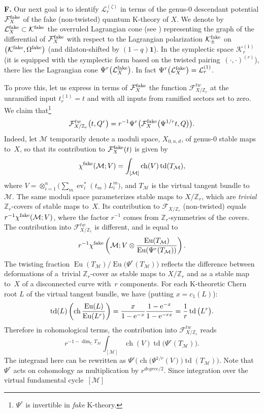 \documentclass[pdftex]{sigma}
\def\F{\mathcal F}
\def\K{\mathcal K}
\def\L{\mathcal L}
\def\1{\mathbf 1}
\def\M{\mathcal M}
\def\ZZ{\mathbb Z}
\def\CC{\mathbb C}
\def\ev{\operatorname{ev}}
\def\td{\operatorname{td}}
\def\ch{\operatorname{ch}}
\def\Eu{\operatorname{Eu}}
\begin{document}
{\bf F.} Our next goal is to identify $\L_r^{(\zeta)}$ in terms of the genus-0 descendant
potential $\F_X^{\rm fake}$ of the fake (non-twisted) quantum K-theory of $X$.
We denote by $\L_X^{\rm fake}\subset \K^{\rm fake}$ the overruled Lag\-rangian cone (see \cite{Co, GiF, GiTo}) representing the graph of the differential of $\F_X^{\rm fake}$ with respect to the Lagrangian polarization $\K^{\rm fake}_{\pm}$ on $\big(\K^{\rm fake}, \Omega^{\rm fake}\big)$ (and dilaton-shifted by $(1-q)\1$). In the symplectic space $\K_r^{(1)}$ (it is equipped with the symplectic form based on the twisted pairing~$(\cdot, \cdot)^{(r)}$), there lies the Lagrangian cone $\Psi^r\big(\L_X^{\rm fake}\big)$. In fact $\Psi^r\big(\L_X^{\rm fake}\big)=\L_r^{(1)}$.

To prove this, let us express in terms of $\F_X^{\rm fake}$ the function $\F_{X/\ZZ_r}^{tw}$ at the unramified input $t^{(1)}_r=t$ and with all inputs from ramified sectors set to zero. We claim that\footnote{$\Psi^r$ is invertible in {\em fake} K-theory.}
\[ \F_{X/\ZZ_r}^{tw}\big(t, Q^r\big) = r^{-1}\Psi^r\big(\F_X^{\rm fake}\big(\Psi^{1/r}t, Q\big)\big).\]
Indeed, let $\M$ temporarily denote a moduli space, $X_{0,n,d}$, of genus-0 stable maps to~$X$, so that its contribution to $\F_X^{\rm fake}(t)$ is given by
\[ \chi^{\rm fake}(\M; V) = \int_{[\M]} \ch (V) \td (T_{\M}),\]
where  $V=\otimes_{i=1}^n \big(\sum_m\ev_i^*(t_m) L_i^m\big)$, and $T_{\M}$ is the virtual tangent bundle to $\M$. The same moduli space parameterizes
stable maps to $X/\ZZ_r$, which are {\em trivial} $\ZZ_r$-covers of stable maps
to~$X$. Its contribution to $\F_{X/\ZZ_r}$ (non-twisted) equals $r^{-1}\chi^{\rm fake}(\M; V)$, where the factor $r^{-1}$ comes from $\ZZ_r$-symmetries of the covers.
The contribution into $\F_{X/\ZZ_r}^{tw}$ is different, and is equal to
\[ r^{-1}\chi^{\rm fake}\left(\M; V \otimes \frac{\Eu(T_{\M})}{\Eu(\Psi^r(T_{\M}))}\right).\]
The twisting fraction $\Eu(T_{\M})/\Eu\big(\Psi^r(T_{\M})\big)$ reflects the difference between deformations of a~trivial $\ZZ_r$-cover as stable maps to $X/\ZZ_r$ and as a stable map to~$X$ of a disconnected curve with~$r$ components. For each K-theoretic Chern root $L$ of the virtual tangent bundle, we have (putting $x=c_1(L)$):
\[\td (L) \left(\ch \frac{\Eu (L)}{\Eu (L^r)}\right) = \frac{x}{1-{\rm e}^{-x}} \frac{1-{\rm e}^{-x}}{1-{\rm e}^{-rx}} = \frac{1}{r} \td \big(L^r\big).\]
Therefore in cohomological terms, the contribution into $\F_{X/\ZZ_r}^{tw}$
reads
\[ r^{-1-\dim_{\CC} T_{\M}}\int_{[\M]} \ch(V) \td \big(\Psi^r(T_{\M})\big). \]
 The integrand here can be rewritten as $\Psi^r \big(\ch \big(\Psi^{1/r}(V)\big) \td (T_{\M})\big)$. Note that $\Psi^r$ acts on cohomology as multiplication by $r^{degree/2}$. Since integration over the virtual fundamental cycle~$[\M]$
\end{document}

